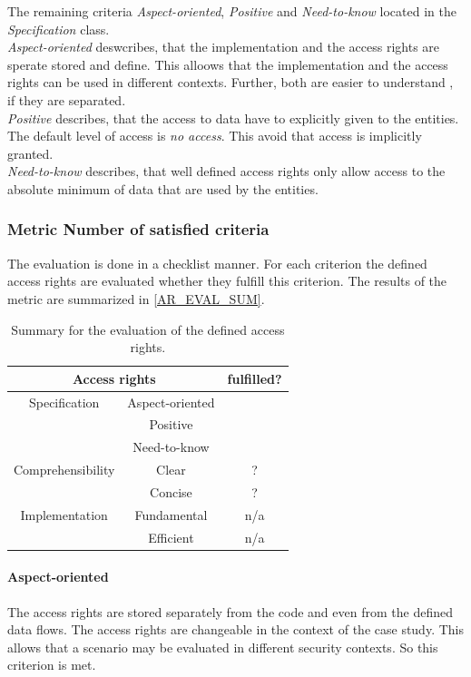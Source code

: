 The remaining criteria \textit{Aspect-oriented}, \textit{Positive} and \textit{Need-to-know} located in the \textit{Specification} class. \\
\textit{Aspect-oriented} deswcribes, that the implementation and the access rights are sperate stored and define. This alloows that the implementation and the access rights can be used in different contexts. Further, both are easier to understand , if they are separated.  \\
\textit{Positive} describes, that the access to data have to explicitly given to the entities. The default level of access is \textit{no access}. This avoid that access is implicitly granted.\\
\textit{Need-to-know} describes, that well defined access rights only allow access to the absolute minimum of data that are used by the entities. \\

\subsubsection{Metric Number of satisfied criteria}
The evaluation is done in a checklist manner. For each criterion the defined access rights are evaluated whether they fulfill this criterion. The results of the metric are summarized in \autoref{AR_EVAL_SUM}.
\begin{table}
\begin{tabular}{|c|c|c|}
\hline 
\multicolumn{2}{|c|}{Access rights} & fulfilled? \\ 
\hline 
Specification & Aspect-oriented & %
 \\ 
\hline 
 & Positive & %
 \\ 
\hline 
 & Need-to-know & %
 \\ 
\hline 
Comprehensibility & Clear & ? \\ 
\hline 
 & Concise & ? \\ 
\hline 
Implementation & Fundamental & n/a \\ 
\hline 
 & Efficient & n/a \\ 
\hline 
\end{tabular} 
\caption{Summary for the evaluation of the defined access rights.} 
\label{AR_EVAL_SUM}
\end{table} 
\paragraph{Aspect-oriented}
The access rights are stored separately from the code and even from the defined data flows. The access rights are changeable in the context of the case study. This allows that a scenario may be evaluated in different security contexts. So this criterion is met.

